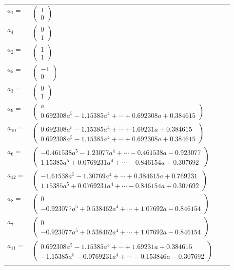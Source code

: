 \documentclass[1p]{elsarticle_modified}
\theoremstyle{definition}
\begin{document}
\begin{tabular}{m{7pt} m{180pt} m{7pt} m{180pt} }
\flushright $a_{1}=$&$\begin{pmatrix}1\\0\end{pmatrix}$ \\
\flushright $a_{4}=$&$\begin{pmatrix}0\\1\end{pmatrix}$ \\
\flushright $a_{2}=$&$\begin{pmatrix}1\\1\end{pmatrix}$ \\
\flushright $a_{5}=$&$\begin{pmatrix}-1\\0\end{pmatrix}$ \\
\flushright $a_{3}=$&$\begin{pmatrix}0\\1\end{pmatrix}$ \\
\flushright $a_{9}=$&$\begin{pmatrix}a\\0.692308 a^{5}-1.15385 a^{4}+\cdots+0.692308 a+0.384615\end{pmatrix}$ \\
\flushright $a_{10}=$&$\begin{pmatrix}0.692308 a^{5}-1.15385 a^{4}+\cdots+1.69231 a+0.384615\\0.692308 a^{5}-1.15385 a^{4}+\cdots+0.692308 a+0.384615\end{pmatrix}$ \\
\flushright $a_{6}=$&$\begin{pmatrix}-0.461538 a^{5}-1.23077 a^{4}+\cdots-0.461538 a-0.923077\\1.15385 a^{5}+0.0769231 a^{4}+\cdots-0.846154 a+0.307692\end{pmatrix}$ \\
\flushright $a_{12}=$&$\begin{pmatrix}-1.61538 a^{5}-1.30769 a^{4}+\cdots+0.384615 a+0.769231\\1.15385 a^{5}+0.0769231 a^{4}+\cdots-0.846154 a+0.307692\end{pmatrix}$ \\
\flushright $a_{8}=$&$\begin{pmatrix}0\\-0.923077 a^{5}+0.538462 a^{4}+\cdots+1.07692 a-0.846154\end{pmatrix}$ \\
\flushright $a_{7}=$&$\begin{pmatrix}0\\-0.923077 a^{5}+0.538462 a^{4}+\cdots+1.07692 a-0.846154\end{pmatrix}$ \\
\flushright $a_{11}=$&$\begin{pmatrix}0.692308 a^{5}-1.15385 a^{4}+\cdots+1.69231 a+0.384615\\-1.15385 a^{5}-0.0769231 a^{4}+\cdots-0.153846 a-0.307692\end{pmatrix}$\\&\end{tabular}
\end{document}
